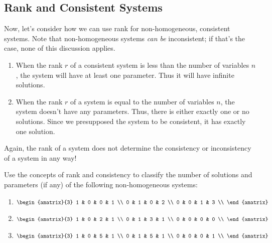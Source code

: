 \documentclass[11pt]{exam}
\begin{document}
    \vspace{20px}
    \subsection{Rank and Consistent Systems}
    Now, let's consider how we can use rank for non-homogeneous, consistent systems. Note that non-homogeneous systems \textit{can be} inconsistent;
    if that's the case, none of this discussion applies.

    \begin{enumerate}
        \item When the rank $r$ of a consistent system is less than the number of variables $n$, the system will have at least one parameter.
        Thus it will have infinite solutions.
        \item When the rank $r$ of a system is equal to the number of variables $n$, the system doesn't have any parameters.
        Thus, there is either exactly one or no solutions. Since we presupposed the system to be consistent, it has exactly one solution.
    \end{enumerate}

    Again, the rank of a system does not determine the consistency or inconsistency of a system in any way!

    \begin{questions}
        \item Use the concepts of rank and consistency to classify the number of solutions and parameters (if any) of the following
        non-homogeneous systems:
        \begin{enumerate}
            \item $\begin{amatrix}{3}
                1 & 0 & 0 & 1 \\
                0 & 1 & 0 & 2 \\
                0 & 0 & 1 & 3 \\
            \end{amatrix}$
            \item $\begin{amatrix}{3}
                1 & 0 & 2 & 1 \\
                0 & 1 & 3 & 1 \\
                0 & 0 & 0 & 0 \\
            \end{amatrix}$
            \item $\begin{amatrix}{3}
                1 & 0 & 5 & 1 \\
                0 & 1 & 5 & 1 \\
                0 & 0 & 0 & 1 \\
            \end{amatrix}$
        \end{enumerate}     
    \end{questions}
\end{document}
